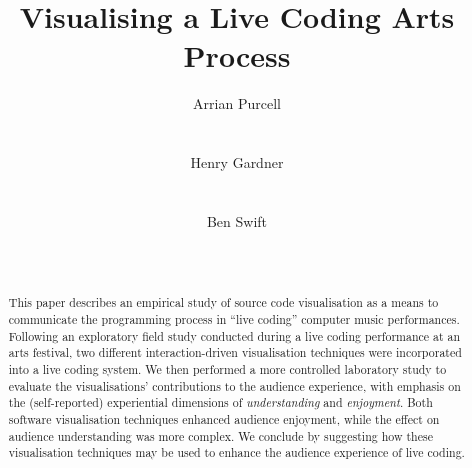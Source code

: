 \documentclass{sig-alternate}
\begin{document}

\title{Visualising a Live Coding Arts Process}

\author{
\alignauthor Arrian Purcell\\
       \\
       \\
\alignauthor Henry Gardner\\
       \\
       \\
\alignauthor Ben Swift\\
       \\
       \\
}

\maketitle
\begin{abstract}
  This paper describes an empirical study of source code visualisation
  as a means to communicate the programming process in ``live coding''
  computer music performances. Following an exploratory field study
  conducted during a live coding performance at an arts festival, two
  different interaction-driven visualisation techniques were
  incorporated into a live coding system. We then performed a more
  controlled laboratory study to evaluate the visualisations'
  contributions to the audience experience, with emphasis on the
  (self-reported) experiential dimensions of \emph{understanding} and
  \emph{enjoyment}. Both software visualisation techniques enhanced
  audience enjoyment, while the effect on audience understanding was
  more complex. We conclude by suggesting how these visualisation
  techniques may be used to enhance the audience experience of live
  coding.
\end{abstract}



\end{document}
